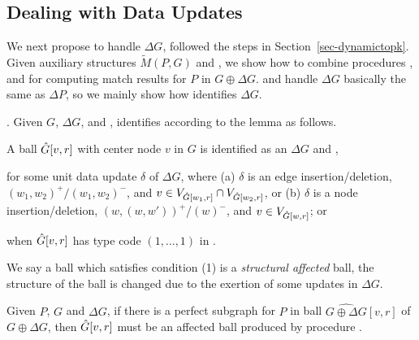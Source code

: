 \subsection{Dealing with Data Updates}
\label{subsec-Ginc}

We next propose \incd to handle $\Delta G$, followed the steps in Section~\ref{sec-dynamictopk}.
Given auxiliary structures $\tilde{M}(P,G)$ and \fb,
we show how to combine procedures \identifyaffball, \incmatch and \comb for computing match results for $P$ in $G \oplus \Delta G$.
%
\incmatch and \comb handle $\Delta G$ basically the same as $\Delta P$, so we mainly show how \identifyaffball identifies \affballsx \wrt $\Delta G$.


.
Given $G$, $\Delta G$, and \fb, \identifyaffball identifies \affballsx according to the lemma as follows.

\begin{lemma}
\label{lemma-incgrdata-affballs}
A ball $\hat{G}{[v,r]}$ with center node $v$ in $G$ is identified as an \affballx \wrt $\Delta G$ and \fb,

 for some unit data update $\delta$ of $\Delta G$, where
(a) $\delta$ is an edge insertion/deletion, $(w_1,w_2)^+/(w_1,w_2)^-$, and $v\in V_{\hat{G}{[w_1,r]}}\cap V_{\hat{G}{[w_2,r]}}$, or
(b) $\delta$ is a node insertion/deletion, $(w,(w,w'))^+$/$(w)^-$, and $v\in V_{\hat{G}{[w,r]}}$; or

 when $\hat{G}{[v,r]}$ has type code $(1,\ldots,1)$  in \fb.
\end{lemma}

We say a ball which satisfies condition (1) is a {\em structural affected} ball,
\ie the structure of the ball is changed due to the exertion of some updates in $\Delta G$.

\vspace{-0.5ex}
\begin{prop}
\label{prop-affected-datainc}
Given $P$, $G$ and $\Delta G$, if there is a perfect subgraph for $P$ in  ball $\widehat{G\oplus\Delta G}{[v,r]}$ of $G\oplus \Delta G$,
then $\hat{G}{[v,r]}$ must be an affected ball produced by procedure \identifyaffball.
\end{prop}


